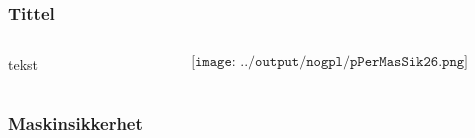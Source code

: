 \documentclass[aspectratio=169,xcolor=dvipsnames]{beamer}
\begin{document}
\begin{frame}
	\frametitle{Tittel}
	\begin{columns}
		\begin{column}{0.5\textwidth}
tekst
			
		\end{column}

		\begin{column}{0.5\textwidth}
	$$\texttt{[image: ../output/nogpl/pPerMasSik26.png]}$$
		\end{column}
	\end{columns}
\end{frame}

\begin{frame}
	\frametitle{Maskinsikkerhet}
\end{frame}
\end{document}
